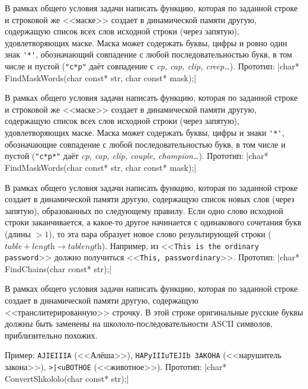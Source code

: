 \begin{zztask}
В рамках общего условия задачи написать функцию, которая по заданной строке
и строковой же <<маске>> создает в динамической памяти другую, содержащую список
всех слов исходной строки (через запятую), удовлетворяющих маске. Маска может
содержать буквы, цифры и ровно один знак \verb|'*'|, обозначающий совпадение с любой
последовательностью букв, в том числе и пустой (\verb|"c*p"| даёт совпадение с
\textit{cp, cap, clip, creep\dots}).
%
Прототип: |char* FindMaskWords(char const* str, char const* mask);|
\end{zztask}

\begin{zztask}
В рамках общего условия задачи написать функцию, которая по заданной строке
и строковой же <<маске>> создает в динамической памяти другую, содержащую список
всех слов исходной строки (через запятую), удовлетворяющих маске. Маска может
содержать буквы, цифры и знаки \verb|'*'|, обозначающие совпадение с любой
последовательностью букв, в том числе и пустой (\verb|"c*p*"| даёт
\textit{cp, cap, clip, couple, champion\dots}).
%
Прототип: |char* FindMaskWords(char const* str, char const* mask);|
\end{zztask}

\begin{zztask}
В рамках общего условия задачи написать функцию, которая по заданной строке
создает в динамической памяти другую, содержащую список новых слов (через
запятую), образованных по следующему правилу. Если одно слово исходной строки
заканчивается, а какое-то другое начинается с одинакового сочетания букв
(длины $> 1$), то эта пара образует новое слово результирующей строки
($\textit{table} + \textit{length} \rightarrow \textit{tablength}$).
Например, из
<<\texttt{This is the ordinary password}>>
должно получиться
<<\texttt{This, passwordinary}>>.
%
Прототип: |char* FindChains(char const* str);|
\end{zztask}

\begin{zztask}
В рамках общего условия задачи написать функцию, которая по заданной строке
создает в динамической памяти другую, содержащую <<транслитерированную>>
строчку. В этой строке оригинальные русские буквы должны быть заменены на
школоло-последовательности ASCII символов, приблизительно похожих.

Пример:
\verb|AJIEIIIA| (<<Алёша>>), \verb|HAPyIIIuTEJIb 3AKOHA|
(<<нарушитель закона>>), \verb!>|<uBOTHOE! (<<животное>>).
%
Прототип: |char* ConvertShkololo(char const* str);|
\end{zztask}

